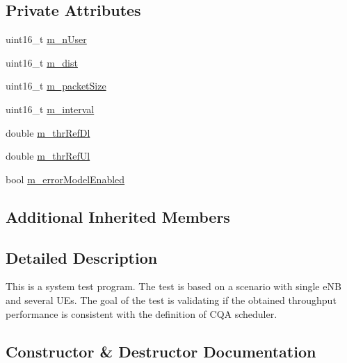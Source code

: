 \subsection*{Private Attributes}
\begin{DoxyCompactItemize}
\item 
uint16\+\_\+t \hyperlink{classLenaCqaFfMacSchedulerTestCase1_a30de491612daf3ae61a52937b2aa0cc8}{m\+\_\+n\+User}
\item 
uint16\+\_\+t \hyperlink{classLenaCqaFfMacSchedulerTestCase1_a21bc608b208134468db88788c108a6d9}{m\+\_\+dist}
\item 
uint16\+\_\+t \hyperlink{classLenaCqaFfMacSchedulerTestCase1_a5f070f8da521f4003c049f67b62b7b5b}{m\+\_\+packet\+Size}
\item 
uint16\+\_\+t \hyperlink{classLenaCqaFfMacSchedulerTestCase1_a1fe70b0e82d40f8e0a6cdc64a6ccf75d}{m\+\_\+interval}
\item 
double \hyperlink{classLenaCqaFfMacSchedulerTestCase1_aab86f96d8685faf3165d51f2ebac50ce}{m\+\_\+thr\+Ref\+Dl}
\item 
double \hyperlink{classLenaCqaFfMacSchedulerTestCase1_a2ba50ab260c28764c305521f07eb8b9a}{m\+\_\+thr\+Ref\+Ul}
\item 
bool \hyperlink{classLenaCqaFfMacSchedulerTestCase1_aeb7beb046b6a90eaeae3a489a01622c7}{m\+\_\+error\+Model\+Enabled}
\end{DoxyCompactItemize}
\subsection*{Additional Inherited Members}


\subsection{Detailed Description}
This is a system test program. The test is based on a scenario with single e\+NB and several U\+Es. The goal of the test is validating if the obtained throughput performance is consistent with the definition of C\+QA scheduler. 

\subsection{Constructor \& Destructor Documentation}
